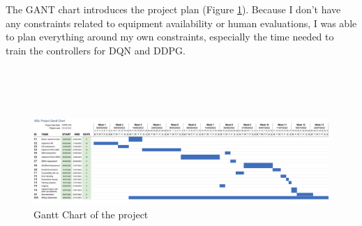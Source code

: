 The GANT chart introduces the project plan (Figure \ref{gantt}). Because I don't have any constraints related to equipment availability or human evaluations, I was able to plan everything around my own constraints, especially the time needed to train the controllers for DQN and DDPG. \\

\begin{landscape}
\phantom{centering}\\
\phantom{centering}\\
\phantom{centering}\\
\begin{figure}[H]
\includegraphics[angle=0, scale=0.092]{Figures/gantt.png}
\caption{Gantt Chart of the project}
\label{gantt}
\end{figure}
\end{landscape}